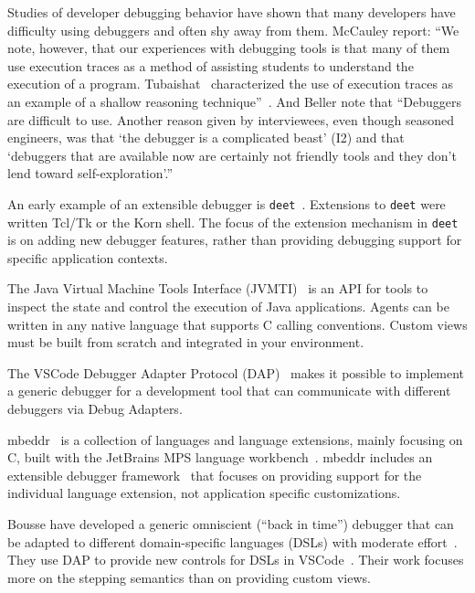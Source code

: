 \documentclass[sigplan,anonymous,review,10pt]{acmart}
\newcommand\deet{{\tt deet}\xspace}
\begin{document}
Studies of developer debugging behavior have shown that many developers have difficulty using debuggers and often shy away from them.
McCauley \etal report:
``We note, however, that our experiences with debugging tools is that many of them use execution traces as a method of assisting students to understand the execution of a program. Tubaishat~\cite{Tuba01a} characterized the use of execution traces as an example of a shallow reasoning technique''~\cite{McCa08a}.
And Beller \etal note that
``Debuggers are difficult to use. Another reason given by interviewees, even though seasoned engineers, was that `the debugger is a complicated beast' (I2) and that `debuggers that are available now are certainly not friendly tools and they don't lend toward self-exploration'.''
\cite{Bell18a}

An early example of an extensible debugger is \deet~\cite{Hans97a}.
Extensions to \deet were written Tcl/Tk or the Korn shell.
The focus of the extension mechanism in \deet is on adding new debugger features, rather than providing debugging support for specific application contexts.

The Java Virtual Machine Tools Interface (JVMTI)~\cite{JVMTI24} is an API for tools to inspect the state and control the execution of Java applications.
Agents can be written in any native language that supports C calling conventions.
Custom views must be built from scratch and integrated in your environment.

The VSCode Debugger Adapter Protocol (DAP)~\cite{DAP21} makes it possible to implement a generic debugger for a development tool that can communicate with different debuggers via Debug Adapters.

mbeddr~\cite{Voel17a} is a collection of languages and language extensions, mainly focusing on C, built with the JetBrains MPS language workbench~\cite{Camp14a}.
mbeddr includes an extensible debugger framework~\cite{Pavl15a} that focuses on providing support for the individual language extension, not application specific customizations.

Bousse \etal have developed a generic omniscient (``back in time'') debugger that can be adapted to different domain-specific languages (DSLs) with moderate effort~\cite{Bous18a}.
They use DAP to provide new controls for DSLs in VSCode~\cite{Enet23a}.
Their work focuses more on the stepping semantics than on providing custom views.
\end{document}
